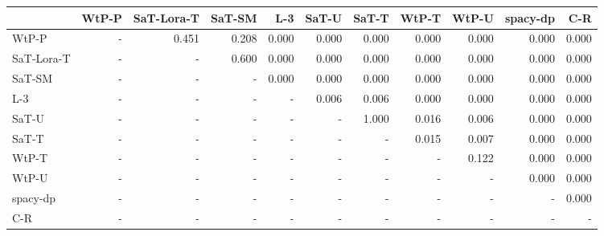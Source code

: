 \begin{tabular}{lrrrrrrrrrr}
\toprule
 & WtP-P & SaT-Lora-T & SaT-SM & L-3 & SaT-U & SaT-T & WtP-T & WtP-U & spacy-dp & C-R \\
\midrule
WtP-P & - & 0.451 & 0.208 & 0.000 & 0.000 & 0.000 & 0.000 & 0.000 & 0.000 & 0.000 \\
SaT-Lora-T & - & - & 0.600 & 0.000 & 0.000 & 0.000 & 0.000 & 0.000 & 0.000 & 0.000 \\
SaT-SM & - & - & - & 0.000 & 0.000 & 0.000 & 0.000 & 0.000 & 0.000 & 0.000 \\
L-3 & - & - & - & - & 0.006 & 0.006 & 0.000 & 0.000 & 0.000 & 0.000 \\
SaT-U & - & - & - & - & - & 1.000 & 0.016 & 0.006 & 0.000 & 0.000 \\
SaT-T & - & - & - & - & - & - & 0.015 & 0.007 & 0.000 & 0.000 \\
WtP-T & - & - & - & - & - & - & - & 0.122 & 0.000 & 0.000 \\
WtP-U & - & - & - & - & - & - & - & - & 0.000 & 0.000 \\
spacy-dp & - & - & - & - & - & - & - & - & - & 0.000 \\
C-R & - & - & - & - & - & - & - & - & - & - \\
\bottomrule
\end{tabular}

